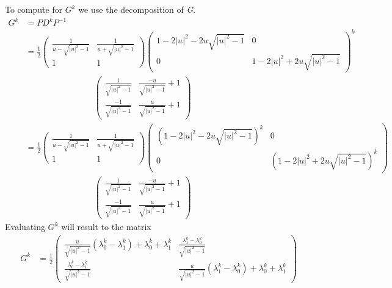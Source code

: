 To compute for $G^{k}$ we use the decomposition of \textit{G}.
\begin{align}
G^{k} &= PD^{k}P^{-1}\\
&=
\frac{1}{2}
\begin{pmatrix}
\frac{1}{u - \sqrt{\left\vert u \right\vert^{2} - 1}} & \frac{1}{u + \sqrt{\left\vert u \right\vert^{2} - 1}}\\
1 & 1
\end{pmatrix}
\begin{pmatrix}
1 - 2\vert u \vert^2 - 2u\sqrt{\vert u \vert^2 - 1} & 0 \\
0 & 1 - 2\vert u \vert^2 + 2u\sqrt{\vert u \vert^2 - 1}
\end{pmatrix}^{k}\\
& \quad\quad\quad\quad\quad\quad\quad\quad
\begin{pmatrix}
\frac{1}{\sqrt{\vert u \vert^2 - 1}} & \frac{-u}{\sqrt{\vert u \vert^2 - 1}} + 1\\
\frac{-1}{\sqrt{\vert u \vert^2 - 1}} & \frac{u}{\sqrt{\vert u \vert^2 - 1}} + 1 
\end{pmatrix}\nonumber\\
&=
\frac{1}{2}
\begin{pmatrix}
\frac{1}{u - \sqrt{\left\vert u \right\vert^{2} - 1}} & \frac{1}{u + \sqrt{\left\vert u \right\vert^{2} - 1}}\\
1 & 1
\end{pmatrix}
\begin{pmatrix}
\left(1 - 2\vert u \vert^2 - 2u\sqrt{\vert u \vert^2 - 1}\right)^{k} & 0 \\
0 & \left(1 - 2\vert u \vert^2 + 2u\sqrt{\vert u \vert^2 - 1}\right)^{k}
\end{pmatrix}\\
& \quad\quad\quad\quad\quad\quad\quad\quad
\begin{pmatrix}
\frac{1}{\sqrt{\vert u \vert^2 - 1}} & \frac{-u}{\sqrt{\vert u \vert^2 - 1}} + 1\\
\frac{-1}{\sqrt{\vert u \vert^2 - 1}} & \frac{u}{\sqrt{\vert u \vert^2 - 1}} + 1
\end{pmatrix}\nonumber
\end{align}
Evaluating $G^{k}$ will result to the matrix
\begin{align}
G^{k} &= \frac{1}{2}
\begin{pmatrix}
\frac{u}{\sqrt{\vert u \vert^2 - 1}}\left(\lambda_0^k - \lambda_1^k \right) + \lambda_0^k + \lambda_1^k & \frac{\lambda_1^k - \lambda_0^k}{\sqrt{\vert u \vert^2 - 1}}\\
\frac{\lambda_0^k - \lambda_1^k}{\sqrt{\vert u \vert^2 - 1}} & \frac{u}{\sqrt{\vert u \vert^2 - 1}}\left(\lambda_1^k - \lambda_0^k \right) + \lambda_0^k + \lambda_1^k
\end{pmatrix}
\end{align}

